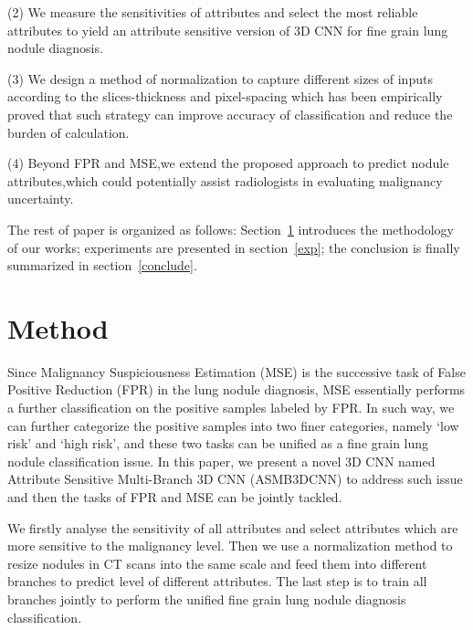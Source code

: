 \documentclass[runningheads]{llncs}
\begin{document}
(2) We measure the sensitivities of attributes and select the most reliable attributes to yield an attribute sensitive version of 3D CNN for fine grain lung nodule diagnosis.

(3) We design a method of normalization to capture different sizes of inputs according to the slices-thickness and pixel-spacing which has been empirically proved that such strategy can improve accuracy of classification and reduce the burden of calculation.

(4) Beyond FPR and MSE,we extend the proposed approach to predict nodule attributes,which could potentially assist radiologists in evaluating malignancy uncertainty.

The rest of paper is organized as follows: Section~\ref{method} introduces the methodology of our works; experiments are presented in section~\ref{exp}; the conclusion is finally summarized in section~\ref{conclude}.



\section{Method}
\label{method}
Since Malignancy Suspiciousness Estimation (MSE) is the successive task of False Positive Reduction (FPR) in the lung nodule diagnosis, MSE essentially performs a further classification on the positive samples labeled by FPR. In such way, we can further categorize the positive samples into two finer categories, namely `low risk' and `high risk', and these two tasks can be unified as a fine grain lung nodule classification issue. In this paper, we present a novel 3D CNN named  Attribute Sensitive Multi-Branch 3D CNN (ASMB3DCNN) to address such issue and then the tasks of FPR and MSE can be jointly tackled. 

We firstly analyse the sensitivity of all attributes and select attributes which are more sensitive to the malignancy level.  Then we use a normalization method to resize nodules in CT scans into the same scale and feed them into different branches to predict level of different attributes. The last step is to train all branches jointly to perform the unified fine grain lung nodule diagnosis classification.
\end{document}
